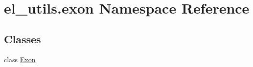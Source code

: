 \hypertarget{namespaceel__utils_1_1exon}{\section{el\-\_\-utils.\-exon Namespace Reference}
\label{namespaceel__utils_1_1exon}
}
\subsection*{Classes}
\begin{DoxyCompactItemize}
\item 
class \hyperlink{classel__utils_1_1exon_1_1Exon}{Exon}
\end{DoxyCompactItemize}
